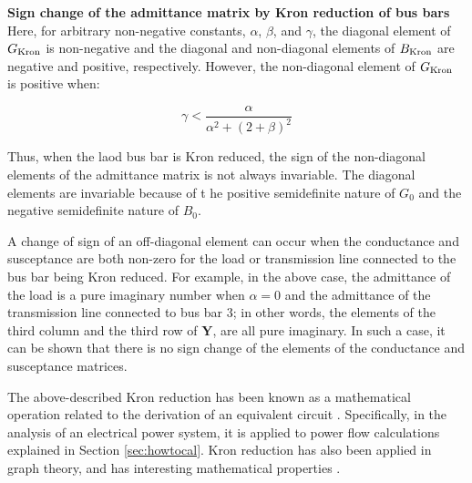 \documentclass[graybox, envcountchap]{svmult}
\begin{document}
\begin{example}{\textbf{Sign change of the admittance matrix by Kron reduction of bus
bars}}
Here, for arbitrary non-negative constants, $\alpha$, $\beta$, and $\gamma$, the
diagonal element of $G_{\rm Kron}$ is non-negative and the diagonal and
non-diagonal elements of $B_{\rm Kron}$ are negative and positive, respectively.
However, the non-diagonal element of $G_{\rm Kron}$ is positive when:

\begin{equation*}
  \gamma < \frac{\alpha}{\alpha^2 + (2+\beta)^2} 
\end{equation*}

Thus, when the laod bus bar is Kron reduced, the sign of the non-diagonal
elements of the admittance matrix is not always invariable. The diagonal
elements are invariable because of t he positive semidefinite nature of $G_0$
and the negative semidefinite nature of $B_0$.

A change of sign of an off-diagonal element can occur when the conductance and
susceptance are both non-zero for the load or transmission line connected to the
bus bar being Kron reduced. For example, in the above case, the admittance of
the load is a pure imaginary number when $\alpha=0$ and the admittance of the
transmission line connected to bus bar 3; in other words, the elements of the
third column and the third row of $\bm{Y}$, are all pure imaginary. In such a
case, it can be shown that there is no sign change of the elements of the
conductance and susceptance matrices.

\end{example}

The above-described Kron reduction has been known as a mathematical operation
related to the derivation of an equivalent circuit \cite{kron1939tensor}.
Specifically, in the analysis of an electrical power system, it is applied to
power flow calculations explained in Section \ref{sec:howtocal}. Kron reduction
has also been applied in graph theory, and has interesting mathematical
properties \cite{dorfler2013kron}.


%

\end{document}
